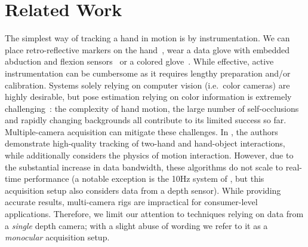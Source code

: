



\section{Related Work}
\label{sec:related}

The simplest way of tracking a hand in motion is by instrumentation. We can place retro-reflective markers on the hand~\cite{zhao2012marker}, wear a data glove with embedded abduction and flexion sensors~\cite{dipietro2008survey} or a colored glove~\cite{wang2009colorglove}. While effective, active instrumentation can be cumbersome as it requires lengthy preparation and/or calibration. 
Systems solely relying on computer vision (i.e.\ color cameras) are highly desirable, but pose estimation  relying on color information is extremely challenging~\cite{erol2007survey}: the complexity of hand motion, the large number of self-occlusions and rapidly changing backgrounds all contribute to its limited success so far. Multiple-camera acquisition can mitigate these challenges. In \cite{ballan2013salient}, the authors demonstrate high-quality tracking of two-hand and hand-object interactions, while \cite{wang2013physics} additionally considers the physics of motion interaction. However, due to the substantial increase in data bandwidth, these algorithms do not scale to real-time performance (a notable exception is the 10Hz system of  \cite{sridhar2013multicam}, but this acquisition setup also considers data from a depth sensor). While providing accurate results, multi-camera rigs are  impractical for consumer-level applications. Therefore, we limit our attention to techniques relying on data from a \emph{single} depth camera; with a slight abuse of wording we refer to it as a \emph{monocular} acquisition setup.

